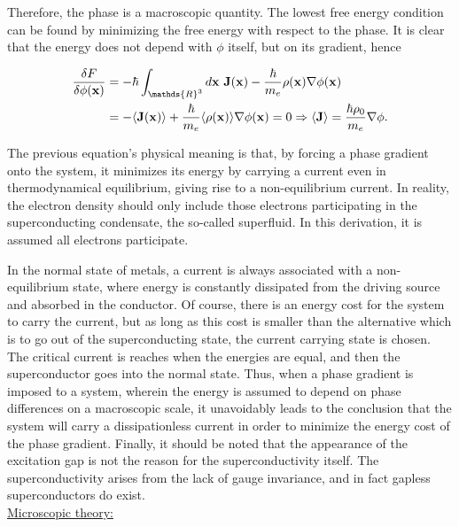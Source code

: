 \documentclass{homework}
\begin{document}
Therefore, the phase is a macroscopic quantity. The lowest free energy condition can be found by minimizing the free energy with respect to the phase. It is clear that the energy does not depend with $\phi$ itself, but on its gradient, hence

\begin{equation}
\begin{split}
    \frac{\delta F}{\delta \phi({\bf x})} &= - \hbar \int_{\mathds{R}^3} d{\bf x} \blanky {\bf J}({\bf x}) - \frac{\hbar}{m_e} \rho({\bf x}) \nabla \phi({\bf x}) \\
    &= - \langle {\bf J}({\bf x}) \rangle + \frac{\hbar}{m_e} \langle \rho({\bf x}) \rangle \nabla \phi({\bf x}) = 0   \Rightarrow \langle {\bf J} \rangle = \frac{\hbar \rho_0}{m_e} \nabla \phi.
\end{split}
\end{equation}

The previous equation's physical meaning is that, by forcing a phase gradient onto the system, it minimizes its energy by carrying a current even in thermodynamical equilibrium, giving rise to a non-equilibrium current. In reality, the electron density should only include those electrons participating in the superconducting condensate, the so-called superfluid. In this derivation, it is assumed all electrons participate. 

In the normal state of metals, a current is always associated with a non-equilibrium state, where energy is constantly dissipated from the driving source and absorbed in the conductor. Of course, there is an energy cost for the system to carry the current, but as long as this cost is smaller than the alternative which is to go out of the superconducting state, the current carrying state is chosen. The critical current is reaches when the energies are equal, and then the superconductor goes into the normal state. Thus, when a phase gradient is imposed to a system, wherein the energy is assumed to depend on phase differences on a macroscopic scale, it unavoidably leads to the conclusion that the system will carry a dissipationless current in order to minimize the energy cost of the phase gradient. Finally, it should be noted that the appearance of the excitation gap is not the reason for the superconductivity itself. The superconductivity arises from the lack of gauge invariance, and in fact gapless superconductors do exist. \\

\underline{Microscopic theory:} 
\end{document}
